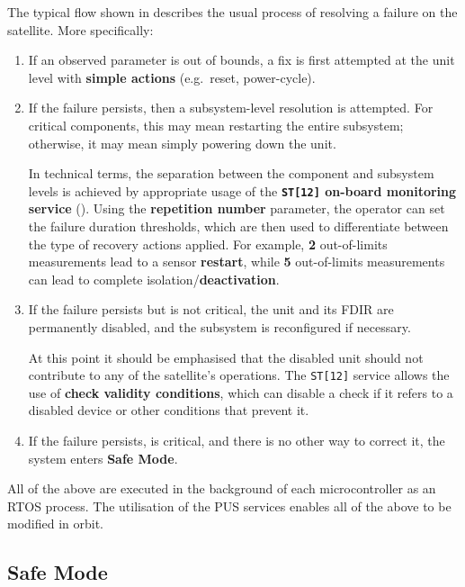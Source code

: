 \documentclass[a4paper,nobib]{tufte-book}
\begin{document}
The typical flow shown in  describes the usual process of resolving a failure on the satellite. More specifically:
\begin{enumerate}
	\item If an observed parameter is out of bounds, a fix is first attempted at the unit level with \textbf{simple actions} (e.g.\ reset, power-cycle).
	\item If the failure persists, then a subsystem-level resolution is attempted. For critical components, this may mean restarting the entire subsystem; otherwise, it may mean simply powering down the unit.
	
	In technical terms, the separation between the component and subsystem levels is achieved by appropriate usage of the \textbf{\texttt{ST[12]} on-board monitoring service} (). Using the \textbf{repetition number} parameter, the operator can set the failure duration thresholds, which are then used to differentiate between the type of recovery actions applied. 	
	For example, \textbf{2} out-of-limits measurements lead to a sensor \textbf{restart}, while \textbf{5} out-of-limits measurements can lead to complete isolation/\textbf{deactivation}.

	\item If the failure persists but is not critical, the unit and its \acs{FDIR} are permanently disabled, and the subsystem is reconfigured if necessary.
	
	At this point it should be emphasised that the disabled unit should not contribute to any of the satellite's operations. The \texttt{ST[12]} service allows the use of \textbf{check validity conditions}, which can disable a check if it refers to a disabled device or other conditions that prevent it.
	\item If the failure persists, is critical, and there is no other way to correct it, the system enters \textbf{Safe Mode}.
\end{enumerate}

All of the above are executed in the background of each microcontroller as an \acs{RTOS} process. The utilisation of the \acs{PUS} services enables all of the above to be modified in orbit.

\subsection{Safe Mode}
\label{itm:safe_mode}
\end{document}
